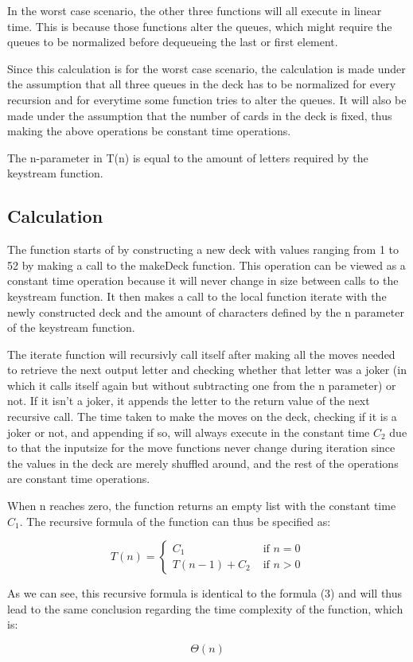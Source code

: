 ﻿\documentclass[12pt,a4paper]{article}
\begin{document}
In the worst case scenario, the other three functions will all execute in linear time.
This is because those functions alter the queues, which might require the queues to be normalized before dequeueing the last or first element.

Since this calculation is for the worst case scenario, the calculation is made under the assumption that all three queues in the deck
has to be normalized for every recursion and for everytime some function tries to alter the queues.
It will also be made under the assumption that the number of cards in the deck is fixed, thus making the above operations be constant time operations.

The n-parameter in T(n) is equal to the amount of letters required by the keystream function.

\subsection{Calculation}
The function starts of by constructing a new deck with values ranging from 1 to 52 by making a call to the makeDeck function.
This operation can be viewed as a constant time operation because it will never change in size between calls to the keystream function.
It then makes a call to the local function iterate with the newly constructed deck and the amount of characters defined by the n parameter of the keystream function.

The iterate function will recursivly call itself after making all the moves needed to retrieve the next output letter and checking whether that letter
was a joker (in which it calls itself again but without subtracting one from the n parameter) or not. If it isn't a joker, it appends the letter
to the return value of the next recursive call.
The time taken to make the moves on the deck, checking if it is a joker or not, and appending if so, will always execute in the constant time \(C_2\) due to that
the inputsize for the move functions never change during iteration since the values in the deck are merely shuffled around, 
and the rest of the operations are constant time operations.

When n reaches zero, the function returns an empty list with the constant time \(C_1\).
The recursive formula of the function can thus be specified as:

\begin{equation}
T(n) = 
\begin{cases}
C_1  &  \text{ if } n = 0 \\
T(n - 1) + C_2  &  \text{ if } n > 0
\end{cases}
\end{equation}

As we can see, this recursive formula is identical to the formula (3) and will thus lead to the same conclusion regarding the time complexity of the function, which is:

\begin{equation}
\Theta(n)
\end{equation}
\end{document}
